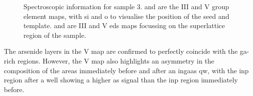 \begin{figure}
{    }
    \caption[Spectroscopic analysis of sample 3.]{Spectroscopic information for sample 3.  and  are the III and V group element maps, with \acs{si} and \acs{o} to visualise the position of the seed and template.  and  are III and V \acs{eds} maps focussing on the superlattice region of the sample.}
    \label{fig:s3_maps}
\end{figure}

The arsenide layers in the V map are confirmed to perfectly coincide with the \acs{ga}-rich regions. However, the V map also highlights an asymmetry in the composition of the areas immediately before and after an \acs{ingaas} \acs{qw}, with the \acs{inp} region after a well showing a higher \acl{as} signal than the \acs{inp} region immediately before.

